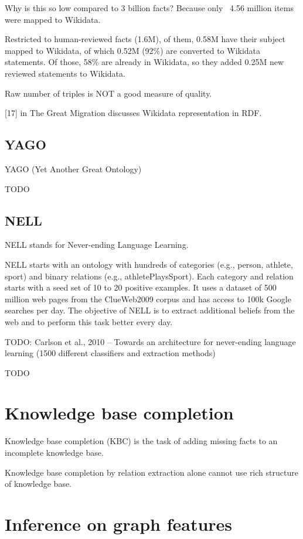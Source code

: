 Why is this so low compared to 3 billion facts? Because only ~4.56 million items
were mapped to Wikidata.

Restricted to human-reviewed facts (1.6M), of them, 0.58M have their subject
mapped to Wikidata, of which 0.52M (92\%) are converted to Wikidata statements.
Of those, 58\% are already in Wikidata, so they added 0.25M new reviewed
statements to Wikidata.

Raw number of triples is NOT a good measure of quality.

[17] in The Great Migration discusses Wikidata representation in RDF.

\subsection{YAGO}

YAGO (Yet Another Great Ontology)

TODO

\subsection{NELL}

NELL stands for Never-ending Language Learning.

NELL starts with an ontology with hundreds of categories (e.g., person, athlete,
sport) and binary relations (e.g., athletePlaysSport). Each category and
relation starts with a seed set of 10 to 20 positive examples.
It uses a dataset of 500 million web pages from the ClueWeb2009 corpus and
has access to 100k Google searches per day.
The objective of NELL is to extract additional beliefs from the web and to
perform this task better every day.

TODO: Carlson et al., 2010 -- Towards an architecture for never-ending language
learning (1500 different classifiers and extraction methods)

TODO

\section{Knowledge base completion}

Knowledge base completion (KBC) is the task of adding missing facts to an
incomplete knowledge base.

Knowledge base completion by relation extraction alone cannot use rich structure
of knowledge base.

\section{Inference on graph features}


